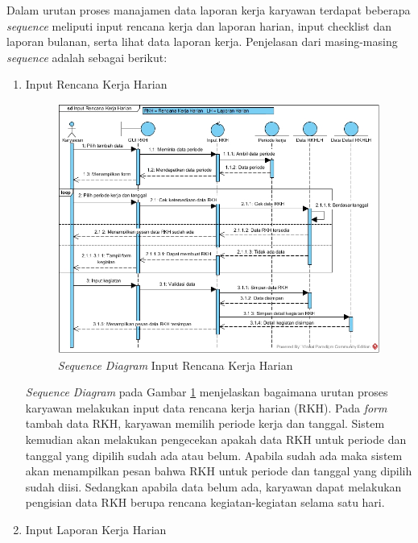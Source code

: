 \begin{enumerate}
            	Dalam urutan proses manajamen data laporan kerja karyawan terdapat beberapa \emph{sequence} meliputi input rencana kerja dan laporan harian, input checklist dan laporan bulanan, serta lihat data laporan kerja. Penjelasan dari masing-masing \emph{sequence} adalah sebagai berikut:
            	\begin{enumerate}[label=\alph*.]
            	    \itemsep0em
            	    \item Input Rencana Kerja Harian
            	    \begin{figure}[H]
            		    \centering            		    \includegraphics[width=14cm]{gambar/sequence/input-propeka-rkh}
            		    \caption{\emph{Sequence Diagram} Input Rencana Kerja Harian}
            		    \label{sequence_input_propeka_rkh}
            		\end{figure}
            		\emph{Sequence Diagram} pada Gambar \ref{sequence_input_propeka_rkh} menjelaskan bagaimana urutan proses karyawan melakukan input data rencana kerja harian (RKH). Pada \emph{form} tambah data RKH, karyawan memilih periode kerja dan tanggal. Sistem kemudian akan melakukan pengecekan apakah data RKH untuk periode dan tanggal yang dipilih sudah ada atau belum. Apabila sudah ada maka sistem akan menampilkan pesan bahwa RKH untuk periode dan tanggal yang dipilih sudah diisi. Sedangkan apabila data belum ada, karyawan dapat melakukan pengisian data RKH berupa rencana kegiatan-kegiatan selama satu hari.
            	    \item Input Laporan Kerja Harian
            	    \begin{figure}[H]

\end{figure}
\end{enumerate}
\end{enumerate}
